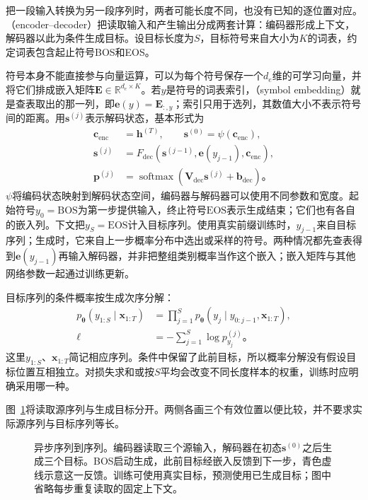 把一段输入转换为另一段序列时，两者可能长度不同，也没有已知的逐位置对应。（encoder--decoder）把读取输入和产生输出分成两套计算：编码器形成上下文，解码器以此为条件生成目标。设目标长度为$S$，目标符号来自大小为$K$的词表，约定词表包含起止符号BOS和EOS。

符号本身不能直接参与向量运算，可以为每个符号保存一个$d_e$维的可学习向量，并将它们排成嵌入矩阵$\bm{E}\in\mathbb{R}^{d_e\times K}$。若$y$是符号的词表索引，（symbol embedding）就是查表取出的那一列，即$\bm{e}(y)=\bm{E}_{:,y}$；索引只用于选列，其数值大小不表示符号间的距离。用$\bm{s}^{(j)}$表示解码状态，基本形式为
\begin{equation}
  \begin{aligned}
    \bm{c}_{\mathrm{enc}}&=\bm{h}^{(T)},\qquad
    \bm{s}^{(0)}=\psi(\bm{c}_{\mathrm{enc}}),\\
    \bm{s}^{(j)}&=F_{\mathrm{dec}}\!\left(
      \bm{s}^{(j-1)},\bm{e}(y_{j-1}),\bm{c}_{\mathrm{enc}}\right),\\
    \bm{p}^{(j)}&=\operatorname{softmax}\!\left(
      \bm{V}_{\mathrm{dec}}\bm{s}^{(j)}+\bm{b}_{\mathrm{dec}}\right)\text{。}
  \end{aligned}
  \label{eq:rnn-encoder-decoder}
\end{equation}
$\psi$将编码状态映射到解码状态空间，编码器与解码器可以使用不同参数和宽度。起始符号$y_0=\mathrm{BOS}$为第一步提供输入，终止符号$\mathrm{EOS}$表示生成结束；它们也有各自的嵌入列。下文把$y_S=\mathrm{EOS}$计入目标序列。使用真实前缀训练时，$y_{j-1}$来自目标序列；生成时，它来自上一步概率分布中选出或采样的符号。两种情况都先查表得到$\bm{e}(y_{j-1})$再输入解码器，并非把整组类别概率当作这个嵌入；嵌入矩阵与其他网络参数一起通过训练更新。

目标序列的条件概率按生成次序分解：
\begin{equation}
  \begin{aligned}
    p_{\bm{\theta}}(y_{1:S}\mid\bm{x}_{1:T})
      &=\prod_{j=1}^{S}p_{\bm{\theta}}
        (y_j\mid y_{0:j-1},\bm{x}_{1:T}),\\
    \ell&=-\sum_{j=1}^{S}\log p^{(j)}_{y_j}\text{。}
  \end{aligned}
  \label{eq:rnn-sequence-likelihood}
\end{equation}
这里$y_{1:S}$、$\bm{x}_{1:T}$简记相应序列。条件中保留了此前目标，所以概率分解没有假设目标位置互相独立。对损失求和或按$S$平均会改变不同长度样本的权重，训练时应明确采用哪一种。

图~\ref{fig:rnn-encoder-decoder}将读取源序列与生成目标分开。两侧各画三个有效位置以便比较，并不要求实际源序列与目标序列等长。
\begin{figure}[t]
  \centering
  
  \caption{异步序列到序列。编码器读取三个源输入，解码器在初态$\bm s^{(0)}$之后生成三个目标。BOS启动生成，此前目标经嵌入反馈到下一步，青色虚线示意这一反馈。训练可使用真实目标，预测使用已生成目标；图中省略每步重复读取的固定上下文。}
  \label{fig:rnn-encoder-decoder}
\end{figure}

